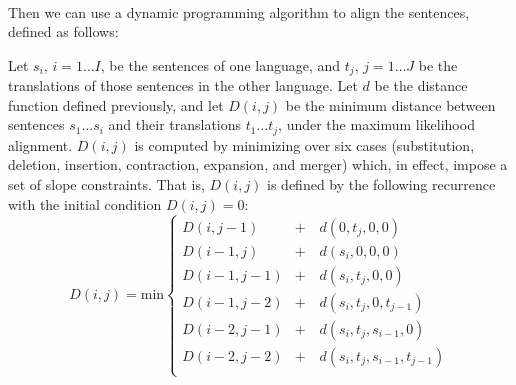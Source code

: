 \paragraph{}{Then we can use a dynamic programming algorithm to align
  the sentences, defined as follows:\cite{gale}}
\begin{displayquote}
  Let $s_i$, $i=1 \dots I$, be the sentences of one language, and
  $t_j$, $j=1 \dots J$ be the translations of those sentences in the
  other language. Let $d$ be the distance function defined previously,
  and let $D(i, j)$ be the minimum distance between sentences
  $s_1 \dots s_i$ and their translations $t_1 \dots t_j$, under the
  maximum likelihood alignment. $D(i, j)$ is computed by minimizing
  over six cases (substitution, deletion, insertion, contraction,
  expansion, and merger) which, in effect, impose a set of slope
  constraints. That is, $D(i, j)$ is defined by the following
  recurrence with the initial condition $D(i, j) = 0$:\\
  $$
  D(i, j) = \text{min}
  \begin{cases}
    D(i, j-1)   &+ \quad d(0,   t_j, 0,       0)       \\
    D(i-1, j)   &+ \quad d(s_i, 0,   0,       0)       \\
    D(i-1, j-1) &+ \quad d(s_i, t_j, 0,       0)       \\
    D(i-1, j-2) &+ \quad d(s_i, t_j, 0,       t_{j-1}) \\
    D(i-2, j-1) &+ \quad d(s_i, t_j, s_{i-1}, 0)       \\
    D(i-2, j-2) &+ \quad d(s_i, t_j, s_{i-1}, t_{j-1}) \\    
  \end{cases}
  $$\\
\end{displayquote}
